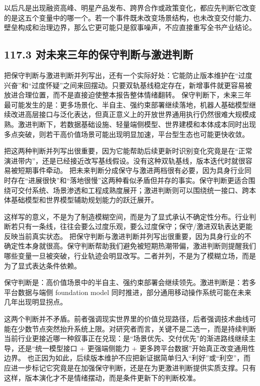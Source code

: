 以后凡是出现融资高峰、明星产品发布、跨界合作或政策变化，都应先判断它改变的是这五个变量中的哪一个。若一个事件既未改变场景结构，也未改变交付能力、壁垒构成和治理边界，那么它更可能只是叙事噪声，不应直接重写全书产业结论。

\subsection*{117.3 对未来三年的保守判断与激进判断}


把保守判断与激进判断并列写出，还有一个实际好处：它能防止版本维护在“过度兴奋”和“过度怀疑”之间来回摆动。只要双轨基线稳定存在，新增事件就更容易被放进合理位置，而不是直接迫使整本报告整体情绪翻转。 保守判断下，未来三年最可能发生的是：更多场景化、半自主、强约束部署继续落地，机器人基础模型继续改进高层接口与泛化表达，但真正意义上的开放世界通用执行仍然很难大规模成熟。激进判断下，若数据基础设施、轻量端侧模型、世界建模和本体成本同时出现多点突破，则若干高价值场景可能出现明显加速，平台型生态也可能更快收敛。

把这两种判断并列写出很重要，因为它能帮助后续更新时识别变化究竟是在“正常演进带内”，还是已经接近改写基线假设。没有这种双轨基线，版本迭代时就很容易被短期事件牵动。 把未来判断分成保守与激进两档很有必要，因为具身行业同时存在“进展很快”和“落地很慢”这两种看似矛盾但并存的事实。保守判断更适合围绕可交付系统、场景渗透和工程成熟度展开；激进判断则可以围绕统一接口、跨本体基础模型和世界模型辅助规划能力的跃迁展开。

这样写的意义，不是为了制造模糊空间，而是为了显式承认不确定性分布。行业判断若只有一条线，往往会要么过度乐观，要么过度保守；保守/激进双轨表达更能反映当前真实状态。 把保守判断与激进判断并列写出很重要，因为具身行业的不确定性本身就很高。保守判断帮助我们避免被短期热潮带偏，激进判断则提醒我们哪些变量一旦被突破，行业轨迹会明显改写。二者并列，不是为了模糊立场，而是为了显式表达条件依赖。

保守判断是：高价值场景中的半自主、强约束部署会继续领先。激进判断是：若多平台数据与端侧 foundation model 同时推进，部分通用移动操作系统可能在未来几年出现明显拐点。

这两个判断并不矛盾。前者强调现实世界里的价值兑现路径，后者强调技术曲线可能在少数节点突然抬升系统上限。对研究者而言，关键不是二选一，而是持续判断当前行业更接近哪一种叙事正在兑现：是“场景优先、交付优先”的渐进路线继续主导，还是“统一模型接口 + 更强端侧能力 + 更多跨平台数据”开始真正改变通用性边界。 也正因为如此，后续版本维护不应把新证据简单归入“利好”或“利空”，而应进一步标记它究竟是在加强保守判断，还是在为更激进判断提供实质支撑。只有这样，版本演化才不是情绪摆动，而是条件更新下的判断校准。

